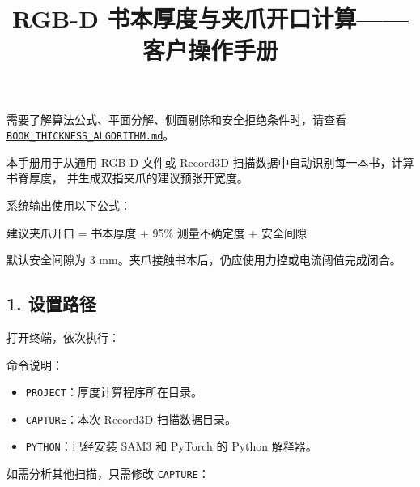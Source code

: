 \documentclass[
  chinese,
  11pt,
  a4paper,
]{article}
\title{RGB-D 书本厚度与夹爪开口计算------客户操作手册}
\author{}
\date{}
\newenvironment{Shaded}{\begin{snugshade}}{\end{snugshade}}
\newcommand{\BuiltInTok}[1]{#1}
\newcommand{\NormalTok}[1]{#1}
\newcommand{\OperatorTok}[1]{\textcolor[rgb]{0.81,0.36,0.00}{\textbf{#1}}}
\newcommand{\VariableTok}[1]{\textcolor[rgb]{0.00,0.00,0.00}{#1}}
\providecommand{\tightlist}{%
  \setlength{\itemsep}{0pt}\setlength{\parskip}{0pt}}
\begin{document}
\maketitle

\renewcommand*\contentsname{目录}
{
\setcounter{tocdepth}{3}
\tableofcontents
}
需要了解算法公式、平面分解、侧面剔除和安全拒绝条件时，请查看
\href{BOOK_THICKNESS_ALGORITHM.md}{\texttt{BOOK\_THICKNESS\_ALGORITHM.md}}。

本手册用于从通用 RGB-D 文件或 Record3D
扫描数据中自动识别每一本书，计算书脊厚度，
并生成双指夹爪的建议预张开宽度。

系统输出使用以下公式：

\begin{Shaded}
\begin{Highlighting}[]
\NormalTok{建议夹爪开口 = 书本厚度 + 95\% 测量不确定度 + 安全间隙}
\end{Highlighting}
\end{Shaded}

默认安全间隙为 3 mm。夹爪接触书本后，仍应使用力控或电流阈值完成闭合。

\subsection{1. 设置路径}\label{1-ux8bbeux7f6eux8defux5f84}

打开终端，依次执行：

\begin{Shaded}
\end{Shaded}

命令说明：

\begin{itemize}
\tightlist
\item
  \texttt{PROJECT}：厚度计算程序所在目录。
\item
  \texttt{CAPTURE}：本次 Record3D 扫描数据目录。
\item
  \texttt{PYTHON}：已经安装 SAM3 和 PyTorch 的 Python 解释器。
\end{itemize}

如需分析其他扫描，只需修改 \texttt{CAPTURE}：
\end{document}
